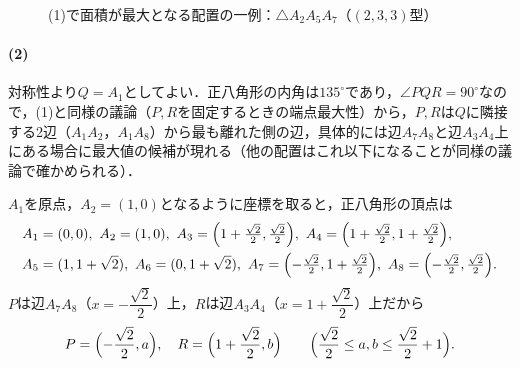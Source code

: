 \documentclass[../../main.tex]{subfiles}
\begin{document}
\begin{figure}[htb]
  \centering
  \caption{(1)で面積が最大となる配置の一例：$\triangle A_2A_5A_7$（$(2,3,3)$型）}
\end{figure}

\paragraph{(2)}

対称性より$Q=A_1$としてよい．正八角形の内角は$135^\circ$であり，$\angle PQR=90^\circ$なので，(1)と同様の議論（$P,R$を固定するときの端点最大性）から，$P,R$は$Q$に隣接する2辺（$A_1A_2$，$A_1A_8$）から最も離れた側の辺，具体的には辺$A_7A_8$と辺$A_3A_4$上にある場合に最大値の候補が現れる（他の配置はこれ以下になることが同様の議論で確かめられる）．

$A_1$を原点，$A_2=(1,0)$となるように座標を取ると，正八角形の頂点は
\begin{align}
  \begin{split}
    A_1&=(0,0),\ A_2=(1,0),\ A_3=\Bigl(1+\tfrac{\sqrt{2}}2,\tfrac{\sqrt{2}}2\Bigr),\ A_4=\Bigl(1+\tfrac{\sqrt{2}}2,1+\tfrac{\sqrt{2}}2\Bigr), \\
    A_5&=(1,1+\sqrt{2}),\ A_6=(0,1+\sqrt{2}),\ A_7=\Bigl(-\tfrac{\sqrt{2}}2,1+\tfrac{\sqrt{2}}2\Bigr),\ A_8=\Bigl(-\tfrac{\sqrt{2}}2,\tfrac{\sqrt{2}}2\Bigr).
  \end{split}
\end{align}
$P$は辺$A_7A_8$（$x=-\dfrac{\sqrt{2}}{2}$）上，$R$は辺$A_3A_4$（$x=1+\dfrac{\sqrt{2}}{2}$）上だから
\begin{align}
  P=\Bigl(-\dfrac{\sqrt{2}}{2},a\Bigr),\quad R=\Bigl(1+\dfrac{\sqrt{2}}{2},b\Bigr)\qquad\Bigl(\dfrac{\sqrt{2}}{2}\le a,b\le\dfrac{\sqrt{2}}{2}+1\Bigr).
\end{align}
\end{document}
